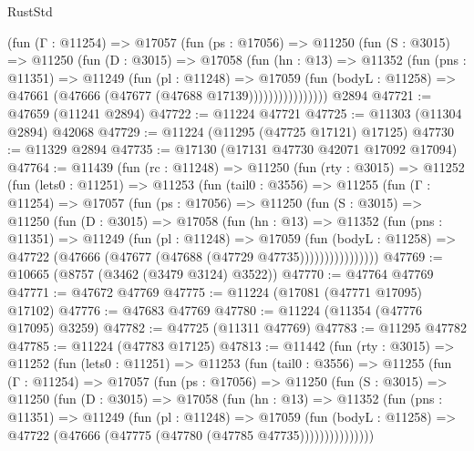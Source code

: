 \begin{lexlean}{RustStd}
\begin{coremodule}
              (fun (Γ : @11254) =>
              @17057
                (fun (ps : @17056) =>
                @11250
                  (fun (S : @3015) =>
                  @11250
                    (fun (D : @3015) =>
                    @17058
                      (fun (hn : @13) =>
                      @11352
                        (fun (pns : @11351) =>
                        @11249
                          (fun (pl : @11248) =>
                          @17059
                            (fun (bodyL : @11258) =>
                            @47661 (@47666 (@47677 (@47688 @17139))))))))))))))))
    @2894
@47721 := @47659 (@11241 @2894)
@47722 := @11224 @47721
@47725 := @11303 (@11304 @2894) @42068
@47729 := @11224 (@11295 (@47725 @17121) @17125)
@47730 := @11329 @2894
@47735 := @17130 (@17131 @47730 @42071 @17092 @17094)
@47764 := @11439
    (fun (rc : @11248) =>
    @11250
      (fun (rty : @3015) =>
      @11252
        (fun (lets0 : @11251) =>
        @11253
          (fun (tail0 : @3556) =>
          @11255
            (fun (Γ : @11254) =>
            @17057
              (fun (ps : @17056) =>
              @11250
                (fun (S : @3015) =>
                @11250
                  (fun (D : @3015) =>
                  @17058
                    (fun (hn : @13) =>
                    @11352
                      (fun (pns : @11351) =>
                      @11249
                        (fun (pl : @11248) =>
                        @17059
                          (fun (bodyL : @11258) =>
                          @47722 (@47666 (@47677 (@47688 (@47729 @47735))))))))))))))))
@47769 := @10665 (@8757 (@3462 (@3479 @3124) @3522))
@47770 := @47764 @47769
@47771 := @47672 @47769
@47775 := @11224 (@17081 (@47771 @17095) @17102)
@47776 := @47683 @47769
@47780 := @11224 (@11354 (@47776 @17095) @3259)
@47782 := @47725 (@11311 @47769)
@47783 := @11295 @47782
@47785 := @11224 (@47783 @17125)
@47813 := @11442
    (fun (rty : @3015) =>
    @11252
      (fun (lets0 : @11251) =>
      @11253
        (fun (tail0 : @3556) =>
        @11255
          (fun (Γ : @11254) =>
          @17057
            (fun (ps : @17056) =>
            @11250
              (fun (S : @3015) =>
              @11250
                (fun (D : @3015) =>
                @17058
                  (fun (hn : @13) =>
                  @11352
                    (fun (pns : @11351) =>
                    @11249
                      (fun (pl : @11248) =>
                      @17059
                        (fun (bodyL : @11258) =>
                        @47722 (@47666 (@47775 (@47780 (@47785 @47735)))))))))))))))

\end{coremodule}
\end{lexlean}
